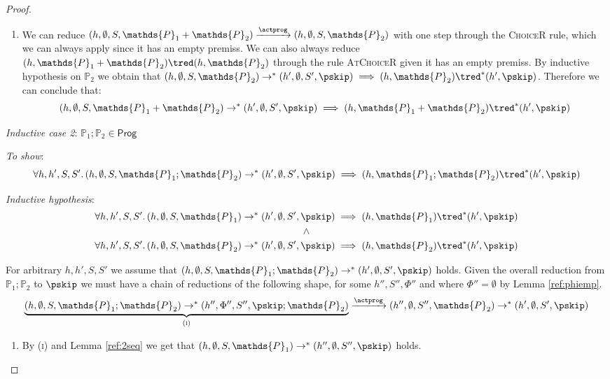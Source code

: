 \begin{thm}
{\begin{proof}
\begin{enumerate}
	\item We can reduce $(h, \emptyset, S, \mathds{P}_1 + \mathds{P}_2) \xrightarrow{\actprog} (h, \emptyset, S, \mathds{P}_2)$ with one step through the \textsc{ChoiceR} rule, which we can always apply since it has an empty premiss. We can also always reduce $(h, \mathds{P}_1 + \mathds{P}_2) \tred (h, \mathds{P}_2)$ through the rule \textsc{AtChoiceR} given it has an empty premiss. By inductive hypothesis on $\mathds{P}_2$ we obtain that $(h, \emptyset, S, \mathds{P}_2) \rightarrow^* (h', \emptyset, S', \pskip) \implies (h, \mathds{P}_2) \tred^* (h', \pskip)$. Therefore we can conclude that:
	\[
		(h, \emptyset, S, \mathds{P}_1 + \mathds{P}_2) \rightarrow^* (h', \emptyset, S', \pskip) \implies  (h, \mathds{P}_1 + \mathds{P}_2) \tred^* (h', \pskip)
	\]
\end{enumerate}
\indline
\textit{Inductive case 2}: $\mathds{P}_1 ; \mathds{P}_2 \in \mathsf{Prog}$

\textit{To show}:
\[
	\forall h, h', S, S' \ldotp
	(h, \emptyset, S, \mathds{P}_1 ; \mathds{P}_2) \rightarrow^* (h', \emptyset, S', \pskip) \implies 
	(h, \mathds{P}_1 ; \mathds{P}_2 ) \tred^* (h', \pskip)
\]

\textit{Inductive hypothesis}:
\begin{gather*}
	\forall h, h', S, S' \ldotp
	(h, \emptyset, S, \mathds{P}_1) \rightarrow^* (h', \emptyset, S', \pskip) \implies 
	(h, \mathds{P}_1) \tred^* (h', \pskip)
	\\ \land \\
	\forall h, h', S, S' \ldotp
	(h, \emptyset, S, \mathds{P}_2) \rightarrow^* (h', \emptyset, S', \pskip) \implies 
	(h, \mathds{P}_2) \tred^* (h', \pskip)
\end{gather*}

For arbitrary $h, h', S, S'$ we assume that $(h, \emptyset, S, \mathds{P}_1 ; \mathds{P}_2) \rightarrow^* (h', \emptyset, S', \pskip)$ holds. Given the overall reduction from $\mathds{P}_1 ; \mathds{P}_2$ to $\pskip$ we must have a chain of reductions of the following shape, for some $h'', S'', \Phi''$ and where $\Phi'' = \emptyset$ by Lemma \ref{ref:phiemp}.
\[
	\underbrace{(h, \emptyset, S, \mathds{P}_1 ; \mathds{P}_2) \rightarrow^* (h'', \Phi'', S'', \pskip; \mathds{P}_2)}_{(\textsc{i})}
	\xrightarrow{\actprog} (h'', \emptyset, S'', \mathds{P}_2) \rightarrow^* (h', \emptyset, S', \pskip)
\]
\begin{enumerate}
	\item \label{seq:1} By (\textsc{i}) and Lemma \ref{ref:2seq} we get that $(h, \emptyset, S, \mathds{P}_1) \rightarrow^* (h'', \emptyset, S'', \pskip)$ holds.
	

\end{enumerate}
\end{proof}}
\end{thm}
